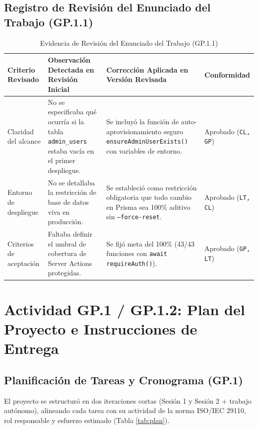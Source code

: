 \documentclass[11pt,a4paper]{article}
\begin{document}
\subsection{Registro de Revisión del Enunciado del Trabajo (GP.1.1)}
\begin{table}[h!]
\centering
\caption{Evidencia de Revisión del Enunciado del Trabajo (GP.1.1)}
\renewcommand{\arraystretch}{1.2}
\begin{tabular}{@{}p{2.8cm}p{5.5cm}p{5.2cm}p{2.2cm}@{}}
\toprule
\rowcolor{tableHeader}
\textbf{Criterio Revisado} & \textbf{Observación Detectada en Revisión Inicial} & \textbf{Corrección Aplicada en Versión Revisada} & \textbf{Conformidad} \\
\midrule
Claridad del alcance & No se especificaba qué ocurría si la tabla \texttt{admin\_users} estaba vacía en el primer despliegue. & Se incluyó la función de auto-aprovisionamiento seguro \texttt{ensureAdminUserExists()} con variables de entorno. & Aprobado (\texttt{CL, GP}) \\
Entorno de despliegue & No se detallaba la restricción de base de datos viva en producción. & Se estableció como restricción obligatoria que todo cambio en Prisma sea 100\% aditivo sin \texttt{--force-reset}. & Aprobado (\texttt{LT, CL}) \\
Criterios de aceptación & Faltaba definir el umbral de cobertura de Server Actions protegidas. & Se fijó meta del 100\% (43/43 funciones con \texttt{await requireAuth()}). & Aprobado (\texttt{GP, LT}) \\
\bottomrule
\end{tabular}
\end{table}

\section{Actividad GP.1 / GP.1.2: Plan del Proyecto e Instrucciones de Entrega}

\subsection{Planificación de Tareas y Cronograma (GP.1)}
El proyecto se estructuró en dos iteraciones cortas (Sesión 1 y Sesión 2 + trabajo autónomo), alineando cada tarea con su actividad de la norma ISO/IEC 29110, rol responsable y esfuerzo estimado (Tabla \ref{tab:plan}).
\end{document}
